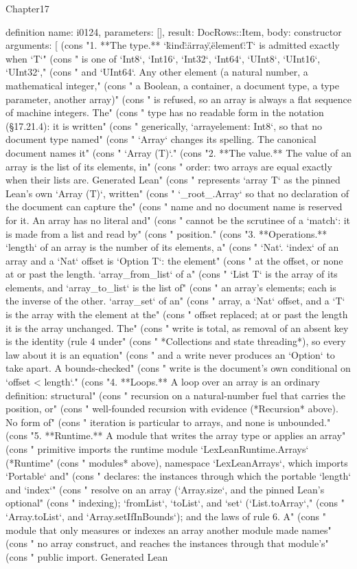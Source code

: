 \begin{lexlean}{Chapter17}
\begin{semanticmodule}
definition{
  name: i0124,
  parameters: [],
  result: DocRows::Item,
  body: constructor{
    arguments: [
      (cons "1. **The type.** `{\"kind\":\"array\",\"element\":T}` is admitted exactly when `T`" (cons "   is one of `Int8`, `Int16`, `Int32`, `Int64`, `UInt8`, `UInt16`, `UInt32`," (cons "   and `UInt64`. Any other element (a natural number, a mathematical integer," (cons "   a Boolean, a container, a document type, a type parameter, another array)" (cons "   is refused, so an array is always a flat sequence of machine integers. The" (cons "   type has no readable form in the notation (§17.21.4): it is written" (cons "   generically, `array{element: Int8}`, so that no document type named" (cons "   `Array` changes its spelling. The canonical document names it" (cons "   `Array (T)`." (cons "2. **The value.** The value of an array is the list of its elements, in" (cons "   order: two arrays are equal exactly when their lists are. Generated Lean" (cons "   represents `array T` as the pinned Lean's own `Array (T)`, written" (cons "   `_root_.Array` so that no declaration of the document can capture the" (cons "   name and no document name is reserved for it. An array has no literal and" (cons "   cannot be the scrutinee of a `match`: it is made from a list and read by" (cons "   position." (cons "3. **Operations.** `length` of an array is the number of its elements, a" (cons "   `Nat`. `index` of an array and a `Nat` offset is `Option T`: the element" (cons "   at the offset, or none at or past the length. `array_from_list` of a" (cons "   `List T` is the array of its elements, and `array_to_list` is the list of" (cons "   an array's elements; each is the inverse of the other. `array_set` of an" (cons "   array, a `Nat` offset, and a `T` is the array with the element at the" (cons "   offset replaced; at or past the length it is the array unchanged. The" (cons "   write is total, as removal of an absent key is the identity (rule 4 under" (cons "   *Collections and state threading*), so every law about it is an equation" (cons "   and a write never produces an `Option` to take apart. A bounds-checked" (cons "   write is the document's own conditional on `offset < length`." (cons "4. **Loops.** A loop over an array is an ordinary definition: structural" (cons "   recursion on a natural-number fuel that carries the position, or" (cons "   well-founded recursion with evidence (*Recursion* above). No form of" (cons "   iteration is particular to arrays, and none is unbounded." (cons "5. **Runtime.** A module that writes the array type or applies an array" (cons "   primitive imports the runtime module `LexLeanRuntime.Arrays` (*Runtime" (cons "   modules* above), namespace `LexLeanArrays`, which imports `Portable` and" (cons "   declares: the instances through which the portable `length` and `index`" (cons "   resolve on an array (`Array.size`, and the pinned Lean's optional" (cons "   indexing); `fromList`, `toList`, and `set` (`List.toArray`," (cons "   `Array.toList`, and `Array.setIfInBounds`); and the laws of rule 6. A" (cons "   module that only measures or indexes an array another module made names" (cons "   no array construct, and reaches the instances through that module's" (cons "   public import. Generated Lean }}
\end{semanticmodule}
\end{lexlean}
